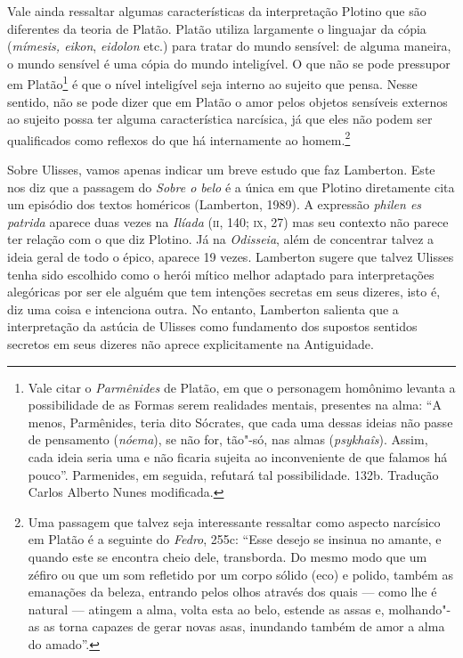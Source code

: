 Vale ainda ressaltar algumas características da interpretação
Plotino que são diferentes da teoria de Platão. Platão utiliza
largamente o linguajar da cópia (\emph{mímesis, eikon},
\emph{eidolon} etc.) para tratar do mundo sensível: de alguma
maneira, o mundo sensível é uma cópia do mundo inteligível. O que não
se pode pressupor em Platão\footnote{ Vale citar o \emph{Parmênides}
de Platão, em que o personagem homônimo levanta a possibilidade de
as Formas serem realidades mentais, presentes na alma: “A menos,
Parmênides, teria dito Sócrates, que cada uma dessas ideias não passe
de pensamento (\emph{nóema}), se não for, tão"-só, nas almas
(\emph{psykhaîs}). Assim, cada ideia seria uma e não ficaria
sujeita ao inconveniente de que falamos há pouco”.  Parmenides, em
seguida, refutará tal possibilidade. 132b. Tradução Carlos Alberto
Nunes modificada.} é que o nível inteligível seja interno ao sujeito
que pensa. Nesse sentido, não se pode dizer que em Platão o amor
pelos objetos sensíveis externos ao sujeito possa ter alguma
característica narcísica, já que eles não podem ser qualificados como
reflexos do que há internamente ao homem.\footnote{ Uma passagem que
talvez seja interessante ressaltar como aspecto narcísico em Platão é
a seguinte do \emph{Fedro}, 255c: “Esse desejo se insinua no amante,
e quando este se encontra cheio dele, transborda. Do mesmo modo que
um zéfiro ou que um som refletido por um corpo sólido (eco) e polido,
também as emanações da beleza, entrando pelos olhos através dos quais
--- como lhe é natural --- atingem a alma, volta esta ao belo, estende as
assas e, molhando"-as as torna capazes de gerar novas asas, inundando
também de amor a alma do amado”.}

Sobre Ulisses, vamos apenas indicar um breve estudo que faz
Lamberton.
Este nos diz que a passagem do \emph{Sobre o belo} é a única em que
Plotino diretamente cita um episódio dos textos homéricos (Lamberton,
1989). A expressão \emph{philen es patrida} aparece duas vezes na
\emph{Ilíada} (\textsc{ii}, 140; \textsc{ix}, 27) mas seu contexto não parece ter
relação com o que diz Plotino. Já na \emph{Odisseia}, além de
concentrar talvez a ideia geral de todo o épico, aparece 19 vezes.
Lamberton sugere que talvez Ulisses tenha sido escolhido como o herói
mítico melhor adaptado para interpretações alegóricas por ser ele
alguém que tem intenções secretas em seus dizeres, isto é, diz uma
coisa e intenciona outra. No entanto, Lamberton salienta que a
interpretação da astúcia de Ulisses como fundamento dos supostos
sentidos secretos em seus dizeres não aprece explicitamente na
Antiguidade.

